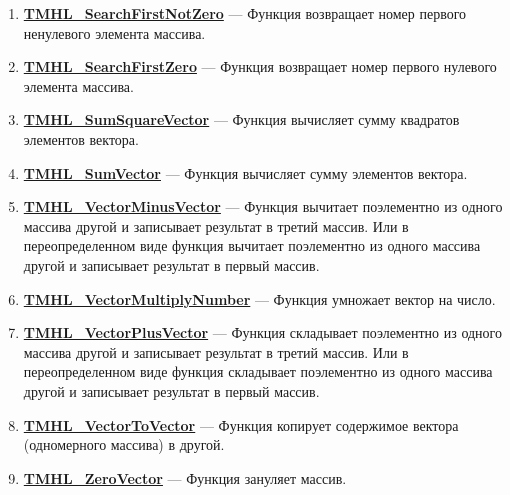 \documentclass[a4paper,12pt]{article}
\begin{document}
\begin{enumerate}
\item \textbf{\hyperref[TMHL_SearchFirstNotZero]{TMHL\_SearchFirstNotZero}} --- Функция возвращает номер первого ненулевого элемента массива.

\item \textbf{\hyperref[TMHL_SearchFirstZero]{TMHL\_SearchFirstZero}} --- Функция возвращает номер первого нулевого элемента массива.

\item \textbf{\hyperref[TMHL_SumSquareVector]{TMHL\_SumSquareVector}} --- Функция вычисляет сумму квадратов элементов вектора.

\item \textbf{\hyperref[TMHL_SumVector]{TMHL\_SumVector}} --- Функция вычисляет сумму элементов вектора.

\item \textbf{\hyperref[TMHL_VectorMinusVector]{TMHL\_VectorMinusVector}} --- Функция вычитает поэлементно из одного массива другой и записывает результат в третий массив. Или в переопределенном виде функция вычитает поэлементно из одного массива другой и записывает результат в первый массив.

\item \textbf{\hyperref[TMHL_VectorMultiplyNumber]{TMHL\_VectorMultiplyNumber}} --- Функция умножает вектор на число.

\item \textbf{\hyperref[TMHL_VectorPlusVector]{TMHL\_VectorPlusVector}} --- Функция складывает поэлементно из одного массива другой и записывает результат в третий массив. Или в переопределенном виде функция складывает поэлементно из одного массива другой и записывает результат в первый массив.

\item \textbf{\hyperref[TMHL_VectorToVector]{TMHL\_VectorToVector}} --- Функция копирует содержимое вектора (одномерного массива) в другой.

\item \textbf{\hyperref[TMHL_ZeroVector]{TMHL\_ZeroVector}} --- Функция зануляет массив.

\end{enumerate}
\end{document}

